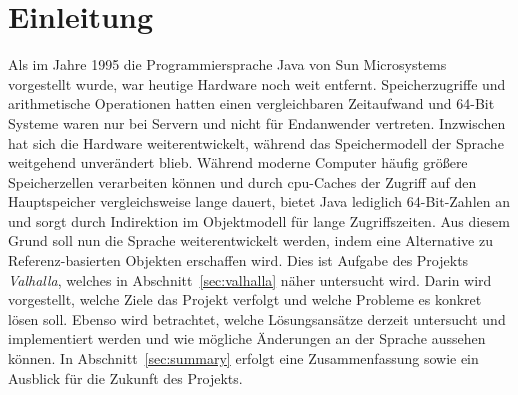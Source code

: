 \section{Einleitung}\label{sec:introduction}

Als im Jahre 1995 die Programmiersprache Java von Sun Microsystems vorgestellt wurde, war heutige Hardware noch weit entfernt.
Speicherzugriffe und arithmetische Operationen hatten einen vergleichbaren Zeitaufwand und 64-Bit Systeme waren nur bei Servern und nicht für Endanwender vertreten.
Inzwischen hat sich die Hardware weiterentwickelt, während das Speichermodell der Sprache weitgehend unverändert blieb.
Während moderne Computer häufig größere Speicherzellen verarbeiten können und durch \ac{cpu}-Caches der Zugriff auf den Hauptspeicher vergleichsweise lange dauert, bietet Java lediglich 64-Bit-Zahlen an und sorgt durch Indirektion im Objektmodell für lange Zugriffszeiten.
Aus diesem Grund soll nun die Sprache weiterentwickelt werden, indem eine Alternative zu Referenz-basierten Objekten erschaffen wird.
Dies ist Aufgabe des Projekts \emph{Valhalla}, welches in Abschnitt~\ref{sec:valhalla} näher untersucht wird.
Darin wird vorgestellt, welche Ziele das Projekt verfolgt und welche Probleme es konkret lösen soll.
Ebenso wird betrachtet, welche Lösungsansätze derzeit untersucht und implementiert werden und wie mögliche Änderungen an der Sprache aussehen können.
In Abschnitt~\ref{sec:summary} erfolgt eine Zusammenfassung sowie ein Ausblick für die Zukunft des Projekts.
